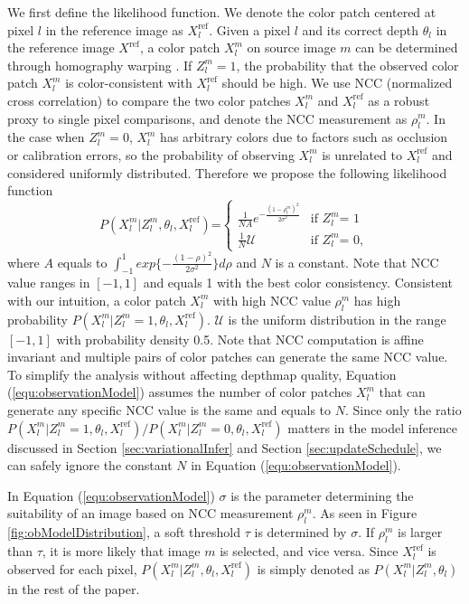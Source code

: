 We first define the likelihood function. We denote the color patch centered at pixel $l$ in the reference image as $X_l^{\text{ref}}$. Given a pixel $l$ and its correct depth $\theta_l$ in the reference image $X^{\text{ref}}$, a color patch $X_l^m$ on source image $m$ can be determined through homography warping \cite{Shen_TIP2013}. If $Z_l^m=1$, the probability that the observed color patch $X_l^m$ is color-consistent with $X_l^{\text{ref}}$ should be high. We use NCC (normalized cross correlation) to compare the two color patches $X_l^m$ and $X_l^{\text{ref}}$ as a robust proxy to single pixel comparisons, and denote the NCC measurement as $\rho_l^m$. In the case when $Z_l^m=0$, $X_l^m$ has arbitrary colors due to factors such as occlusion or calibration errors, so the probability of observing $X_l^m$ is unrelated to $X_l^{\text{ref}}$ and considered uniformly distributed. Therefore we propose the following likelihood function
\begin{equation}
P(X_l^m|Z_l^m, \theta_l, X_l^{\text{ref}}) \text{=}
\begin{cases}
        \frac{1}{NA}e^{-\frac{(1-\rho_l^m)^2}{2\sigma^2}} & \text{if } Z_l^m\text{= }1\\
       \frac{1}{N} \mathcal{U} & \text{if } Z_l^m\text{= } 0\label{equ:observationModel},
\end{cases}
\end{equation}
where $A$ equals to $\int_{-1}^1exp\{-\frac{(1-\rho)^2}{2\sigma^2}\}d\rho$ and $N$ is a constant. Note that NCC value ranges in $[-1,1]$ and equals 1 with the best color consistency. Consistent with our intuition, a color patch $X_l^m$ with high NCC value $\rho_l^m$ has high probability $P(X_l^m|Z_l^m=1, \theta_l,X_l^{\text{ref}})$. $\mathcal{U}$ is the uniform distribution in the range $[-1,1]$ with probability density 0.5. Note that NCC computation is affine invariant and multiple pairs of color patches can generate the same NCC value. To simplify the analysis without affecting depthmap quality, Equation (\ref{equ:observationModel}) assumes the number of color patches $X_l^m$ that can generate any specific NCC value is the same and equals to $N$. Since only the ratio $P(X_l^m|Z_l^m=1, \theta_l, X_l^{\text{ref}})/P(X_l^m|Z_l^m=0, \theta_l, X_l^{\text{ref}})$ matters in the model inference discussed in Section \ref{sec:variationalInfer} and Section \ref{sec:updateSchedule}, we can safely ignore the constant $N$ in Equation (\ref{equ:observationModel}).


In Equation (\ref{equ:observationModel}) $\sigma$ is the parameter determining the suitability of an image  based on NCC measurement $\rho_l^m$. As seen in Figure \ref{fig:obModelDistribution}, a soft threshold $\tau$  is determined by $\sigma$. If $\rho_l^m$ is larger than $\tau$, it is more likely that image $m$ is selected, and vice versa. Since $X_l^{\text{ref}}$ is observed for each pixel, $P(X_l^m|Z_l^m, \theta_l, X_l^{\text{ref}})$ is simply denoted as $P(X_l^m|Z_l^m, \theta_l)$ in the rest of the paper.


